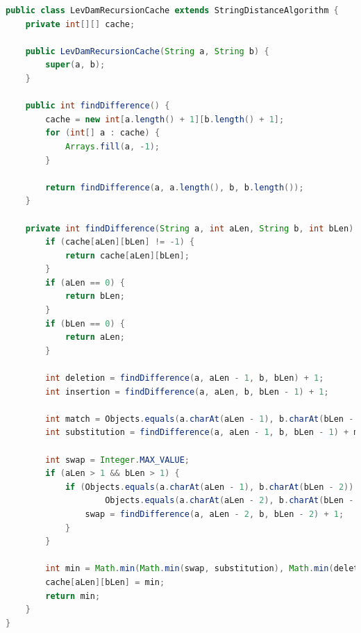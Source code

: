 \documentclass[12pt]{report}
\begin{document}
    \begin{lstlisting}[label=code:levDamRecursionCache,caption=Метод для нахождения расстояния Дамерау-Левенштейна
    рекурсивно \(\text{с матрицей}\),language=java]
public class LevDamRecursionCache extends StringDistanceAlgorithm {
    private int[][] cache;

    public LevDamRecursionCache(String a, String b) {
        super(a, b);
    }

    public int findDifference() {
        cache = new int[a.length() + 1][b.length() + 1];
        for (int[] a : cache) {
            Arrays.fill(a, -1);
        }

        return findDifference(a, a.length(), b, b.length());
    }

    private int findDifference(String a, int aLen, String b, int bLen) {
        if (cache[aLen][bLen] != -1) {
            return cache[aLen][bLen];
        }
        if (aLen == 0) {
            return bLen;
        }
        if (bLen == 0) {
            return aLen;
        }

        int deletion = findDifference(a, aLen - 1, b, bLen) + 1;
        int insertion = findDifference(a, aLen, b, bLen - 1) + 1;

        int match = Objects.equals(a.charAt(aLen - 1), b.charAt(bLen - 1)) ? 0 : 1;
        int substitution = findDifference(a, aLen - 1, b, bLen - 1) + match;

        int swap = Integer.MAX_VALUE;
        if (aLen > 1 && bLen > 1) {
            if (Objects.equals(a.charAt(aLen - 1), b.charAt(bLen - 2)) &&
                    Objects.equals(a.charAt(aLen - 2), b.charAt(bLen - 1))) {
                swap = findDifference(a, aLen - 2, b, bLen - 2) + 1;
            }
        }

        int min = Math.min(Math.min(swap, substitution), Math.min(deletion, insertion));
        cache[aLen][bLen] = min;
        return min;
    }
}
    \end{lstlisting}
\end{document}
